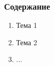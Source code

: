 \begin{frame}
\frametitle{Содержание}

\begin{enumerate}
    \item Тема 1
    \item Тема 2
    \item ...
\end{enumerate}

\end{frame}
